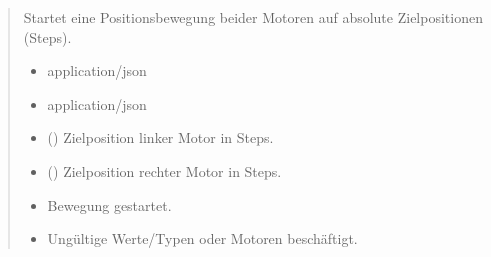 \documentclass[letterpaper,10pt,english]{sphinxmanual}
\begin{document}
\begin{fulllineitems}
\label{\detokenize{agv_rest_api_stepper:post--api-agv-stepper-setMoveAbsolute}}
\pysigstartsignatures
\pysigline
{}
\pysigstopsignatures\begin{quote}\begin{description}
\sphinxAtStartPar
Startet eine Positionsbewegung beider Motoren auf absolute Zielpositionen (Steps).

\begin{itemize}
\item {} 
\sphinxAtStartPar
{} \textendash{} application/json

\end{itemize}

\begin{itemize}
\item {} 
\sphinxAtStartPar
{} \textendash{} application/json

\end{itemize}

\begin{itemize}
\item {} 
\sphinxAtStartPar
{} () \textendash{} Zielposition linker Motor in Steps.

\item {} 
\sphinxAtStartPar
{} () \textendash{} Zielposition rechter Motor in Steps.

\end{itemize}

\begin{itemize}
\item {} 
\sphinxAtStartPar
{} \textendash{} Bewegung gestartet.

\item {} 
\sphinxAtStartPar
{} \textendash{} Ungültige Werte/Typen oder Motoren beschäftigt.

\end{itemize}

\end{description}\end{quote}

\end{fulllineitems}
\end{document}
